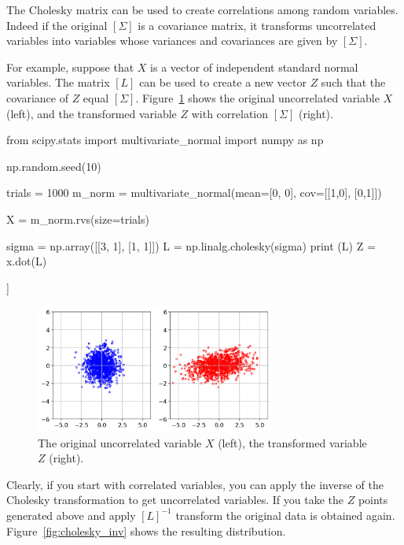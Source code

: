 The Cholesky matrix can be used to create correlations among random variables. Indeed if the original $[\Sigma]$ is a covariance matrix, it transforms uncorrelated variables into variables whose variances and covariances are given by $[\Sigma]$. 

For example, suppose that $X$ is a vector of independent standard normal variables. The matrix $[L]$ can be used to create a new vector $Z$ such that the covariance of $Z$ equal $[\Sigma]$.
Figure~\ref{fig:cholesky_norm} shows the original uncorrelated variable $X$ (left), and the transformed variable $Z$ with correlation $[\Sigma]$ (right).

\begin{ipython}
from scipy.stats import multivariate_normal
import numpy as np

np.random.seed(10)

trials = 1000
m_norm = multivariate_normal(mean=[0, 0], cov=[[1,0],
                                               [0,1]])

X = m_norm.rvs(size=trials)

sigma = np.array([[3, 1], [1, 1]])
L = np.linalg.cholesky(sigma)
print (L)
Z = x.dot(L)
\end{ipython}
\begin{ioutput}
[[1.73205081 0.        ]
 [0.57735027 0.81649658]]
\end{ioutput}

\begin{figure}[htbp]
  \centering
  \includegraphics[width=0.7\textwidth]{figures/cholesky_norm}
  \caption{The original uncorrelated variable $X$ (left), the transformed variable $Z$ (right).}
  \label{fig:cholesky_norm}
\end{figure}

Clearly, if you start with correlated variables, you can apply the inverse of the Cholesky transformation to get uncorrelated variables.
If you take the $Z$ points generated above and apply $[L]^{-1}$ transform the original data is obtained again. Figure~\ref{fig:cholesky_inv} shows the resulting distribution.

